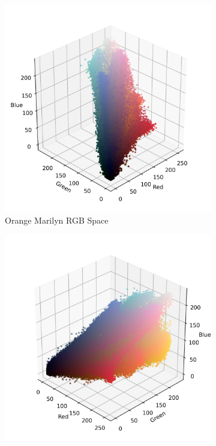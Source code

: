 \documentclass{article}
\begin{document}
\begin{figure}[ht]\ContinuedFloat
  \centering
  \begin{subfigure}{0.45\textwidth}
    \includegraphics[width=\textwidth]{main_files/figure-latex/4_3_orange_marilyn_original_scatter.jpg}
    \caption{Orange Marilyn RGB Space}
    \label{fig:4_3_orange_marilyn_original_scatter}
  \end{subfigure}
  \hfill
  \begin{subfigure}{0.45\textwidth}
    \includegraphics[width=\textwidth]{main_files/figure-latex/4_4_orange_marilyn_original_scatter.jpg}

\end{subfigure}
\end{figure}
\end{document}
